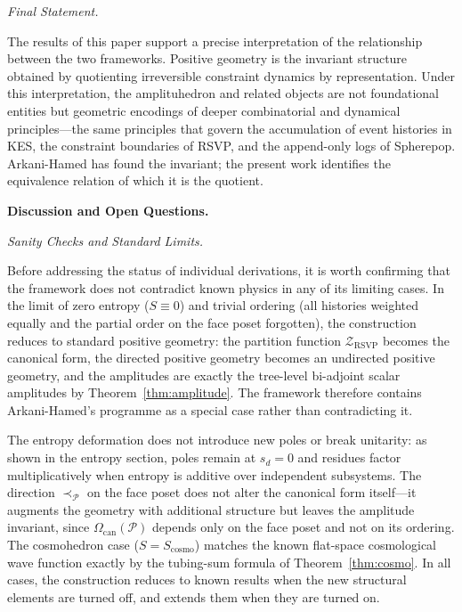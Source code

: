 \documentclass[12pt, oneside]{amsart}
\theoremstyle{plain}
\theoremstyle{definition}
\theoremstyle{remark}
\newcommand{\Sf}{S}
\newcommand{\CF}{\Omega_{\mathrm{can}}}
\newcommand{\ZRSVP}{\mathcal{Z}_{\mathrm{RSVP}}}
\begin{document}
\medskip\noindent\textit{Final Statement.}

The results of this paper support a precise interpretation of the relationship between the two frameworks. Positive geometry is the invariant structure obtained by quotienting irreversible constraint dynamics by representation. Under this interpretation, the amplituhedron and related objects are not foundational entities but geometric encodings of deeper combinatorial and dynamical principles---the same principles that govern the accumulation of event histories in KES, the constraint boundaries of RSVP, and the append-only logs of Spherepop. Arkani-Hamed has found the invariant; the present work identifies the equivalence relation of which it is the quotient.

\bigskip\noindent\textbf{Discussion and Open Questions.}
\label{sec:discussion}

\medskip\noindent\textit{Sanity Checks and Standard Limits.}

Before addressing the status of individual derivations, it is worth confirming that the framework does not contradict known physics in any of its limiting cases. In the limit of zero entropy ($\Sf \equiv 0$) and trivial ordering (all histories weighted equally and the partial order on the face poset forgotten), the construction reduces to standard positive geometry: the partition function $\ZRSVP$ becomes the canonical form, the directed positive geometry becomes an undirected positive geometry, and the amplitudes are exactly the tree-level bi-adjoint scalar amplitudes by Theorem~\ref{thm:amplitude}. The framework therefore contains Arkani-Hamed's programme as a special case rather than contradicting it.

The entropy deformation does not introduce new poles or break unitarity: as shown in the entropy section, poles remain at $s_d = 0$ and residues factor multiplicatively when entropy is additive over independent subsystems. The direction $\prec_{\mathcal{P}}$ on the face poset does not alter the canonical form itself---it augments the geometry with additional structure but leaves the amplitude invariant, since $\CF(\mathcal{P})$ depends only on the face poset and not on its ordering. The cosmohedron case ($\Sf = \Sf_{\mathrm{cosmo}}$) matches the known flat-space cosmological wave function exactly by the tubing-sum formula of Theorem~\ref{thm:cosmo}. In all cases, the construction reduces to known results when the new structural elements are turned off, and extends them when they are turned on.
\end{document}
